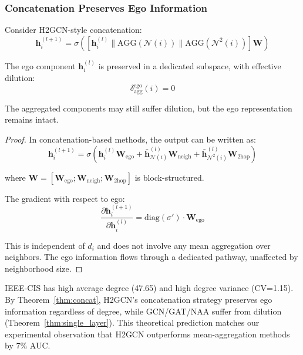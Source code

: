 \subsubsection{Concatenation Preserves Ego Information}

\begin{theorem}
\label{thm:concat}
Consider H2GCN-style concatenation:
\begin{equation}
\mathbf{h}_i^{(l+1)} = \sigma\left(\left[\mathbf{h}_i^{(l)} \| \text{AGG}(\mathcal{N}(i)) \| \text{AGG}(\mathcal{N}^2(i))\right] \mathbf{W}\right)
\end{equation}

The ego component $\mathbf{h}_i^{(l)}$ is preserved in a dedicated subspace, with effective dilution:
\begin{equation}
\delta_{\text{agg}}^{\text{ego}}(i) = 0
\end{equation}

The aggregated components may still suffer dilution, but the ego representation remains intact.
\end{theorem}

\begin{proof}
In concatenation-based methods, the output can be written as:
\begin{equation}
\mathbf{h}_i^{(l+1)} = \sigma\left(\mathbf{h}_i^{(l)} \mathbf{W}_{\text{ego}} + \bar{\mathbf{h}}_{\mathcal{N}(i)}^{(l)} \mathbf{W}_{\text{neigh}} + \bar{\mathbf{h}}_{\mathcal{N}^2(i)}^{(l)} \mathbf{W}_{\text{2hop}}\right)
\end{equation}

where $\mathbf{W} = [\mathbf{W}_{\text{ego}}; \mathbf{W}_{\text{neigh}}; \mathbf{W}_{\text{2hop}}]$ is block-structured.

The gradient with respect to ego:
\begin{equation}
\frac{\partial \mathbf{h}_i^{(l+1)}}{\partial \mathbf{h}_i^{(l)}} = \text{diag}(\sigma') \cdot \mathbf{W}_{\text{ego}}
\end{equation}

This is independent of $d_i$ and does not involve any mean aggregation over neighbors. The ego information flows through a dedicated pathway, unaffected by neighborhood size.
\end{proof}

\begin{remark}
IEEE-CIS has high average degree (47.65) and high degree variance (CV=1.15). By Theorem~\ref{thm:concat}, H2GCN's concatenation strategy preserves ego information regardless of degree, while GCN/GAT/NAA suffer from dilution (Theorem~\ref{thm:single_layer}). This theoretical prediction matches our experimental observation that H2GCN outperforms mean-aggregation methods by 7\% AUC.
\end{remark}

